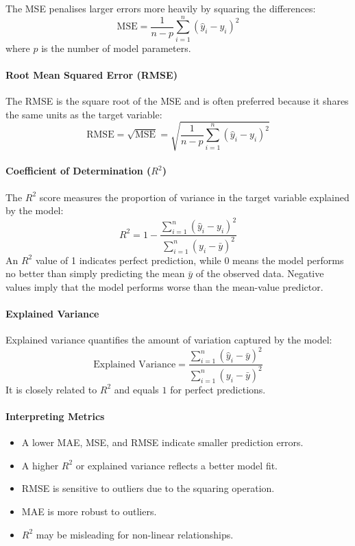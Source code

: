 \documentclass[9pt]{extarticle}
\begin{document}
The MSE penalises larger errors more heavily by squaring the differences:
\[
\text{MSE} = \frac{1}{n - p} \sum_{i=1}^{n} (\hat{y}_i - y_i)^2
\]
where $p$ is the number of model parameters.

\paragraph{Root Mean Squared Error (RMSE)}

The RMSE is the square root of the MSE and is often preferred because it shares the same units as the target variable:
\[
\text{RMSE} = \sqrt{\text{MSE}} = \sqrt{ \frac{1}{n - p} \sum_{i=1}^{n} (\hat{y}_i - y_i)^2 }
\]

\paragraph{Coefficient of Determination ($R^2$)}

The $R^2$ score measures the proportion of variance in the target variable explained by the model:
\[
R^2 = 1 - \frac{\sum_{i=1}^{n} (\hat{y}_i - y_i)^2}{\sum_{i=1}^{n} (y_i - \bar{y})^2}
\]
An $R^2$ value of 1 indicates perfect prediction, while 0 means the model performs no better than simply predicting the mean $\bar{y}$ of the observed data. Negative values imply that the model performs worse than the mean-value predictor.

\paragraph{Explained Variance}

Explained variance quantifies the amount of variation captured by the model:
\[
\text{Explained Variance} = \frac{\sum_{i=1}^{n} (\hat{y}_i - \bar{y})^2}{\sum_{i=1}^{n} (y_i - \bar{y})^2}
\]
It is closely related to $R^2$ and equals $1$ for perfect predictions.

\paragraph{Interpreting Metrics}

\begin{itemize}
    \item A lower MAE, MSE, and RMSE indicate smaller prediction errors.
    \item A higher $R^2$ or explained variance reflects a better model fit.
    \item RMSE is sensitive to outliers due to the squaring operation.
    \item MAE is more robust to outliers.
    \item $R^2$ may be misleading for non-linear relationships.
\end{itemize}
\end{document}
